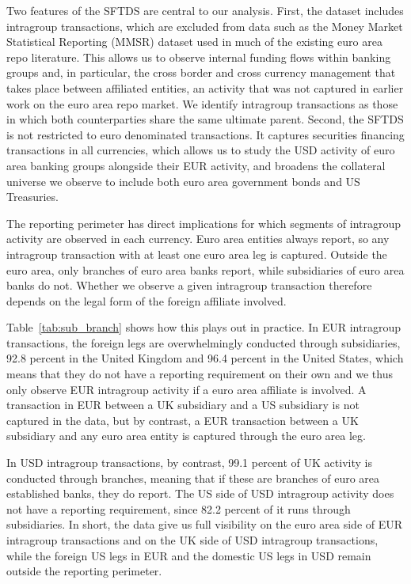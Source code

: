 \documentclass[english, 11pt, oneside, legal]{article}
\begin{document}
Two features of the SFTDS are central to our analysis. First, the dataset includes intragroup transactions, which are excluded from data such as the Money Market Statistical Reporting (MMSR) dataset used in much of the existing euro area repo literature. This allows us to observe internal funding flows within banking groups and, in particular, the cross border and cross currency management that takes place between affiliated entities, an activity that was not captured in earlier work on the euro area repo market. We identify intragroup transactions as those in which both counterparties share the same ultimate parent. Second, the SFTDS is not restricted to euro denominated transactions. It captures securities financing transactions in all currencies, which allows us to study the USD activity of euro area banking groups alongside their EUR activity, and broadens the collateral universe we observe to include both euro area government bonds and US Treasuries.

The reporting perimeter has direct implications for which segments of intragroup activity are observed in each currency. Euro area entities always report, so any intragroup transaction with at least one euro area leg is captured. Outside the euro area, only branches of euro area banks report, while subsidiaries of euro area banks do not. Whether we observe a given intragroup transaction therefore depends on the legal form of the foreign affiliate involved. 

Table~\ref{tab:sub_branch} shows how this plays out in practice. In EUR intragroup transactions, the foreign legs are overwhelmingly conducted through subsidiaries, 92.8 percent in the United Kingdom and 96.4 percent in the United States, which means that they do not have a reporting requirement on their own and we thus only observe EUR intragroup activity if a euro area affiliate is involved. A transaction in EUR between a UK subsidiary and a US subsidiary is not captured in the data, but by contrast, a EUR transaction between a UK subsidiary and any euro area entity is captured through the euro area leg. 

In USD intragroup transactions, by contrast, 99.1 percent of UK activity is conducted through branches, meaning that if these are branches of euro area established banks, they do report. The US side of USD intragroup activity does not have a reporting requirement, since 82.2 percent of it runs through subsidiaries. In short, the data give us full visibility on the euro area side of EUR intragroup transactions and on the UK side of USD intragroup transactions, while the foreign US legs in EUR and the domestic US legs in USD remain outside the reporting perimeter.
\end{document}
